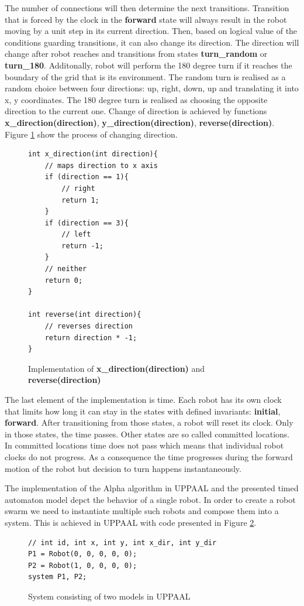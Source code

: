 The number of connections will then determine the next transitions. Transition that is forced by the clock in the \textbf{forward} state will always result in the robot moving by a unit step in its current direction. Then, based on logical value of the conditions guarding transitions, it can also change its direction. The direction will change after robot reaches and transitions from states \textbf{turn\_random} or \textbf{turn\_180}. Additonally, robot will perform the 180 degree turn if it reaches the boundary of the grid that is its environment. The random turn is realised as a random choice between four directions: up, right, down, up and translating it into x, y coordinates. The 180 degree turn is realised as choosing the opposite direction to the current one. Change of direction is achieved by functions \textbf{x\_direction(direction)}, \textbf{y\_direction(direction)}, \textbf{reverse(direction)}. Figure \ref{fig:direction} show the process of changing direction.
\begin{figure}[H]
\caption{Implementation of \textbf{x\_direction(direction)} and \textbf{reverse(direction)}}
\lstset { language=C++ }
\begin{lstlisting}
int x_direction(int direction){
    // maps direction to x axis
    if (direction == 1){
        // right
        return 1;
    }
    if (direction == 3){
        // left
        return -1;
    }
    // neither
    return 0;
}

int reverse(int direction){
    // reverses direction
    return direction * -1;
}
\end{lstlisting}
\label{fig:direction}
\end{figure}

The last element of the implementation is time. Each robot has its own clock that limits how long it can stay in the states with defined invariants: \textbf{initial}, \textbf{forward}. After transitioning from those states, a robot will reset its clock. Only in those states, the time passes. Other states are so called committed locations. In committed locations time does not pass which means that individual robot clocks do not progress. As a consequence the time progresses during the forward motion of the robot but decision to turn happens instantaneously.

The implementation of the Alpha algorithm in UPPAAL and the presented timed automaton model depct the behavior of a single robot. In order to create a robot swarm we need to instantiate multiple such robots and compose them into a system. This is achieved in UPPAAL with code presented in Figure \ref{fig:composition}.
\begin{figure}[H]
\caption{System consisting of two models in UPPAAL}
\lstset { language=C++ }
\begin{lstlisting}
// int id, int x, int y, int x_dir, int y_dir
P1 = Robot(0, 0, 0, 0, 0);
P2 = Robot(1, 0, 0, 0, 0);
system P1, P2;
\end{lstlisting}
\label{fig:composition}
\end{figure}

